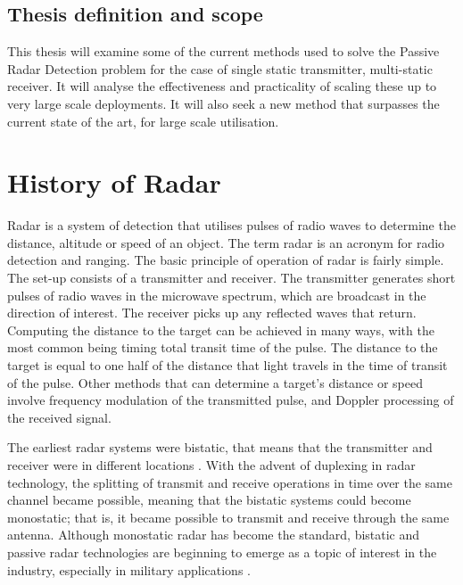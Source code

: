 \documentclass[12pt,openany,a4paper]{book}
\begin{document}
\section{Thesis definition and scope}
This thesis will examine some of the current methods used to solve the Passive Radar Detection problem for the case of single static transmitter, multi-static receiver. It will analyse the effectiveness and practicality of scaling these up to very large scale deployments. It will also seek a new method that surpasses the current state of the art, for large scale utilisation.


\cleardoublepage

\chapter{History of Radar}

Radar is a system of detection that utilises pulses of radio waves to determine the distance, altitude or speed of an object. The term radar is an acronym for radio detection and ranging. The basic principle of operation of radar is fairly simple. The set-up consists of a transmitter and receiver. The transmitter generates short pulses of radio waves in the microwave spectrum, which are broadcast in the direction of interest. The receiver picks up any reflected waves that return. Computing the distance to the target can be achieved in many ways, with the most common being timing total transit time of the pulse. The distance to the target is equal to one half of the distance that light travels in the time of transit of the pulse. Other methods that can determine a target's distance or speed involve frequency modulation of the transmitted pulse, and Doppler processing of the received signal.

\bigskip

The earliest radar systems were bistatic, that means that the transmitter and receiver were in different locations \cite{Willis}. With the advent of duplexing in radar technology, the splitting of transmit and receive operations in time over the same channel became possible, meaning that the bistatic systems could become monostatic; that is, it became possible to transmit and receive through the same antenna. Although monostatic radar has become the standard, bistatic and passive radar technologies are beginning to emerge as a topic of interest in the industry, especially in military applications \cite{Arend}. 

\bigskip
\end{document}
